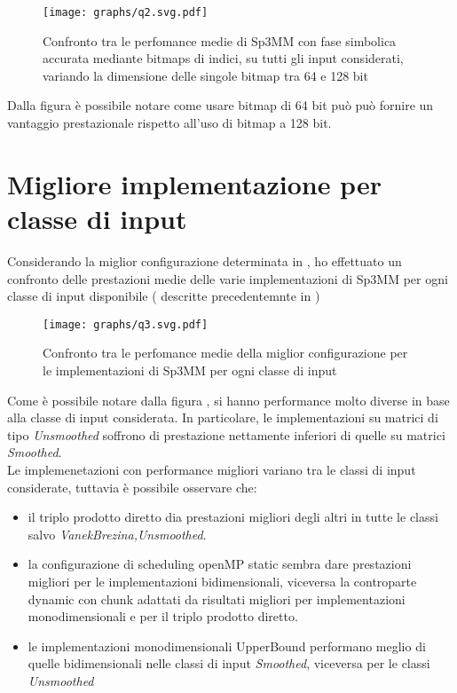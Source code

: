 \begin{figure}[H]
  \centering \texttt{[image: graphs/q2.svg.pdf]}
  \caption[SymbAcc: miglior dimensione per le bitmaps]
  {Confronto tra le perfomance medie di Sp3MM con fase simbolica accurata mediante bitmaps di indici,
		   su tutti gli input considerati, variando la dimensione delle singole bitmap tra 64 e 128 bit}
  \decoRule \label{fig:q2}
\end{figure}
Dalla figura  è possibile notare come usare bitmap di 64 bit può può fornire un vantaggio prestazionale
rispetto all'uso di bitmap a 128 bit.

\section{Migliore implementazione per classe di input} \label{chPerf:q3}
Considerando la miglior configurazione determinata in , ho effettuato un confronto delle prestazioni medie
delle varie implementazioni di Sp3MM per ogni classe di input disponibile ( descritte precedentemnte in  )
\begin{figure}[H]	
  \centering \texttt{[image: graphs/q3.svg.pdf]}
  \caption[miglior implementazione per classe di input]
  {Confronto tra le perfomance medie della miglior configurazione per le implementazioni di Sp3MM per ogni classe di input}
  \label{fig:q3}
\end{figure}
Come è possibile notare dalla figura , si hanno performance molto diverse in base alla classe di input considerata.
In particolare, le implementazioni su matrici di tipo \emph{Unsmoothed} soffrono di prestazione nettamente inferiori di quelle 
su matrici \emph{Smoothed}.\\
Le implemenetazioni con performance migliori variano tra le classi di input considerate, tuttavia è possibile osservare che:
\begin{itemize}		\label{chPerf:inClassPerfOss}
	\item il triplo prodotto diretto dia prestazioni migliori degli altri in tutte le classi salvo \emph{VanekBrezina,Unsmoothed}.
	\item la configurazione di scheduling openMP static sembra dare prestazioni migliori per le implementazioni bidimensionali,
		  viceversa la controparte dynamic con chunk adattati da risultati migliori per implementazioni monodimensionali e per il triplo prodotto diretto.
	\item le implementazioni monodimensionali UpperBound performano meglio di quelle bidimensionali nelle classi di input \emph{Smoothed},
		  viceversa per le classi \emph{Unsmoothed}
\end{itemize}

